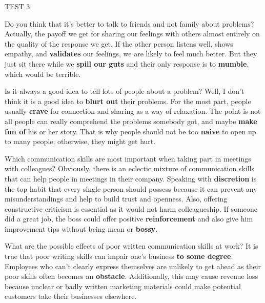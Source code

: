 \begin{glossarymc}[Cambridge 13]
\begin{test}{TEST 3}
    \begin{qa}{Do you think that it’s better to talk to friends and not family about problems?}
    Actually, the payoff we get for sharing our feelings with others almost entirely on the quality of the response we get. If the other person listens well, shows empathy, and \textbf{validates} our feelings, we are likely to feel much better. But they just sit there while we \textbf{spill our guts} and their only response is to \textbf{mumble}, which would be terrible.
    \end{qa}

    \begin{qa}{Is it always a good idea to tell lots of people about a problem?}
    Well, I don’t think it is a good idea to \textbf{blurt out} their problems. For the most part, people usually \textbf{crave} for connection and sharing as a way of relaxation. The point is not all people can really comprehend the problems somebody got, and maybe \textbf{make fun of} his or her story. That is why people should not be too \textbf{naive} to open up to many people; otherwise, they might get hurt.
    \end{qa}

    \begin{qa}{Which communication skills are most important when taking part in meetings with colleagues?}
    Obviously, there is an eclectic mixture of communication skills that can help people in meetings in their company. Speaking with \textbf{discretion} is the top habit that every single person should possess because it can prevent any misunderstandings and help to build trust and openness. Also, offering constructive criticism is essential as it would not harm colleagueship. If someone did a great job, the boss could offer positive \textbf{reinforcement} and also give him improvement tips without being mean or \textbf{bossy}.
    \end{qa}

    \begin{qa}{What are the possible effects of poor written communication skills at work?}
    It is true that poor writing skills can impair one’s business \textbf{to some degree}. Employees who can’t clearly express themselves are unlikely to get ahead as their poor skills often becomes an \textbf{obstacle}. Additionally, this may cause revenue loss because unclear or badly written marketing materials could make potential customers take their businesses elsewhere.
    \end{qa}


\end{test}
\end{glossarymc}
